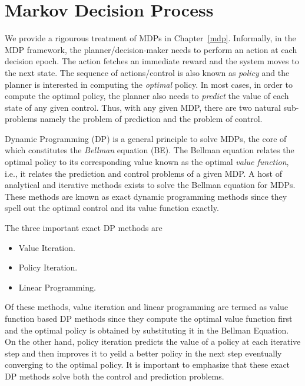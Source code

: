 \section {Markov Decision Process}
We provide a rigourous treatment of MDPs in Chapter~\ref{mdp}. Informally, in the MDP framework, the planner/decision-maker needs to perform an action at each decision epoch. The action fetches an immediate reward and the system moves to the next state.
The sequence of actions/control is also known as \emph{policy} and the planner is interested in computing the \emph{optimal} policy. In most cases, in order to compute the optimal policy, the planner also needs to \emph{predict} the value of each state of any given control. Thus, with any given MDP, there are two natural sub-problems namely the problem of prediction and the problem of control.\par
Dynamic Programming (DP) is a general principle to solve MDPs, the core of which constitutes the \emph{Bellman} equation (BE). The Bellman equation relates the optimal policy to its corresponding value known as the optimal \emph{value function}, i.e., it relates the prediction and control problems of a given MDP. A host of analytical and iterative methods exists to solve the Bellman equation for MDPs. These methods are known as exact dynamic programming methods since they spell out the optimal control and its value function exactly.\par
The three important exact DP methods are 
\begin{itemize}
\item Value Iteration.
\item Policy Iteration.
\item Linear Programming.
\end{itemize}
Of these methods, value iteration and linear programming are termed as value function based DP methods since they compute the optimal value function first and the optimal policy is obtained by substituting it in the Bellman Equation. On the other hand, policy iteration predicts the value of a policy at each iterative step and then improves it to yeild a better policy in the next step eventually converging to the optimal policy. It is important to emphasize that these exact DP methods solve both the control and prediction problems.\par

